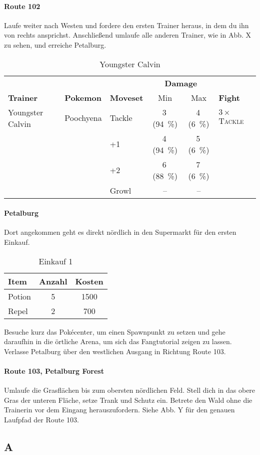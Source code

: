 \documentclass[11pt,a4paper,titlepage]{article}
\begin{document}
\paragraph{Route 102}
Laufe weiter nach Westen und fordere den ersten Trainer heraus, in dem du ihn von rechts ansprichst. Anschließend umlaufe alle anderen Trainer, wie in Abb. X zu sehen, und erreiche Petalburg. 
\begin{table}[htbp]
	\caption{Youngster Calvin}
	\centering
	\begin{tabular}{lllccl}
		\toprule 
		&&&\multicolumn{2}{c}{\textbf{Damage}}&\\
		\cmidrule(rl){4-5}
		\textbf{Trainer}&\textbf{Pokemon}&\textbf{Moveset}&Min&Max&\textbf{Fight}\\ 
		\midrule
		Youngster Calvin&Poochyena&Tackle&3\,(\SI{94}{\percent})&4\,(\SI{6}{\percent})&$3 \times$ \textsc{Tackle}\\
		&&+1&4\,(\SI{94}{\percent})&5\,(\SI{6}{\percent})&\\ 
		&&+2&6\,(\SI{88}{\percent})&7\,(\SI{6}{\percent})&\\
		&&Growl&--&--&\\
		\bottomrule
	\end{tabular}
\end{table}

\paragraph{Petalburg}
Dort angekommen geht es direkt nördlich in den Supermarkt für den ersten Einkauf.
\begin{table}[htbp]
	\caption{Einkauf 1}
	\centering
	\begin{tabular}{lcc}
		\toprule
		\textbf{Item} &\textbf{Anzahl}				&\textbf{Kosten}	\\
		\midrule
		Potion		&5 &1500				\\
		Repel		&2&700				\\
		\bottomrule
	\end{tabular}
	\label{tab:lookup}
\end{table}
Besuche kurz das Pokécenter, um einen Spawnpunkt zu setzen und gehe daraufhin in die örtliche Arena, um sich das Fangtutorial zeigen zu lassen. Verlasse Petalburg über den westlichen Ausgang in Richtung Route 103.\\

\paragraph{Route 103, Petalburg Forest}
Umlaufe die Grasflächen bis zum obersten nördlichen Feld. Stell dich in das obere Gras der unteren Fläche, setze Trank und Schutz ein. Betrete den Wald ohne die Trainerin vor dem Eingang herauszufordern. Siehe Abb. Y für den genauen Laufpfad der Route 103.



\begin{appendix}
\section{A}
\end{appendix}
\end{document}
